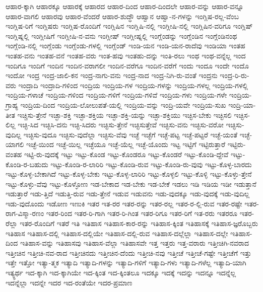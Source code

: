 {ಆಹಾರ-ಕ್ಕಾಗಿ
ಆಹಾರಕ್ಕೂ
ಆಹಾರಕ್ಕೆ
ಆಹಾರದ
ಆಹಾರ-ದಿಂದ
ಆಹಾರ-ದಿಂದಲೇ
ಆಹಾರ-ವನ್ನು
ಆಹಾರ-ವನ್ನೂ
ಆಹಾರ-ವಾಗಲಿ
ಆಹಾರವು
ಆಹಾರ-ವೆಂದರೆ
ಆಹಾರ-ಶುದ್ಧೌ
ಆಹ್ವಾನ
ಆಹ್ವಾ-ನ-ಗಳನ್ನು
ಇಂಗ್ಲಿಷ-ರಲ್ಲ-ವೆಂಬ
ಇಂಗ್ಲಿಷ-ರಿಗೆ
ಇಂಗ್ಲಿಷರು
ಇಂಗ್ಲಿಷ-ರೊಂದಿಗೆ
ಇಂಗ್ಲಿಷಿನ
ಇಂಗ್ಲಿಷಿ-ನಲ್ಲಿ
ಇಂಗ್ಲೀಷಿ-ನಲ್ಲಿ
ಇಂಗ್ಲಿಷಿನ-ವರಿಗೂ
ಇಂಗ್ಲಿಷ್
ಇಂಗ್ಲಿಷ್ನಲ್ಲಿ
ಇಂಗ್ಲೀಷಿಗೆ
ಇಂಗ್ಲೀಷಿ-ನ-ವನು
ಇಂಗ್ಲೀಷ್
ಇಂಗ್ಲೀಷ್ನಲ್ಲಿ
ಇಂಗ್ಲೆಂಡನ್ನು
ಇಂಗ್ಲೆಂಡಿನ
ಇಂಗ್ಲೆಂಡಿನಂಥ
ಇಂಗ್ಲೆಂಡಿ-ನಲ್ಲಿ
ಇಂಗ್ಲೆಂಡು
ಇಂಗ್ಲೆಂಡು-ಗಳಲ್ಲಿ
ಇಂಗ್ಲೆಂಡ್
ಇಂಡಿ-ಯನ
ಇಂಡಿ-ಯನ-ರಾದೆವು
ಇಂಡಿಯಾ
ಇಂತಹ
ಇಂತಹ-ವನು
ಇಂತಹ-ವನೆ
ಇಂತಹ-ವರು
ಇಂತ-ಹವು
ಇಂತಹು-ದನ್ನು
ಇಂತಿ-ರಲು
ಇಂಥ
ಇಂಥ-ವನ್ನೆಲ್ಲ
ಇಂದ
ಇಂದಿಗೂ
ಇಂದಿಗೆ
ಇಂದಿನ
ಇಂದಿನ-ವರಾಗಲೀ
ಇಂದಿನ-ವರೆಗೂ
ಇಂದಿನ-ವರೆಗೆ
ಇಂದು
ಇಂದೂ
ಇಂದೇ
ಇಂದೊ
ಇಂದೋ
ಇಂದ್ರ
ಇಂದ್ರ-ಜಾಲಿ-ಕನ
ಇಂದ್ರ-ನಾಗು-ವನು
ಇಂದ್ರ-ನಾದ
ಇಂದ್ರ-ನಿಗಿ-ರು-ವಂತೆ
ಇಂದ್ರನು
ಇಂದ್ರ-ರಿ-ರು-ವರು
ಇಂದ್ರಾದಿ
ಇಂದ್ರಾದಿ-ಗಳಿಂದ
ಇಂದ್ರಿಯ
ಇಂದ್ರಿಯ-ಗಳ
ಇಂದ್ರಿಯ-ಗಳನ್ನು
ಇಂದ್ರಿಯ-ಗಳಲ್ಲ
ಇಂದ್ರಿಯ-ಗಳಲ್ಲಿ
ಇಂದ್ರಿಯ-ಗಳಾಚೆ
ಇಂದ್ರಿಯ-ಗಳಿಂದ
ಇಂದ್ರಿಯ-ಗಳಿಗೆ
ಇಂದ್ರಿಯ-ಗಳಿವೆ
ಇಂದ್ರಿಯ-ಗಳು
ಇಂದ್ರಿಯ-ಗಳೇ
ಇಂದ್ರಿಯ-ಗ್ರಾಹ್ಯ
ಇಂದ್ರಿಯ-ದಿಂದ
ಇಂದ್ರಿಯ-ಲೋಲುಪತೆ-ಯಲ್ಲಿ
ಇಂದ್ರಿಯ-ವನ್ನು
ಇಂದ್ರಿ-ಯವೇ
ಇಂದ್ರಿಯ-ಸುಖ
ಇಂದ್ರಿ-ಯಾ-ತೀತ
ಇಚ್ಚಿಸು-ತ್ತೇನೆ
ಇಚ್ಛಾ-ಶಕ್ತಿ
ಇಚ್ಛಾ-ಶಕ್ತಿಯ
ಇಚ್ಛಾ-ಶಕ್ತಿ-ಯನ್ನು
ಇಚ್ಛಾ-ಶಕ್ತಿಯು
ಇಚ್ಛಿಸ-ಬೇಕು
ಇಚ್ಛಿಸಲಿ
ಇಚ್ಛಿಸ-ಲಿಲ್ಲ
ಇಚ್ಛಿ-ಸಿದ
ಇಚ್ಛಿಸಿ-ದನು
ಇಚ್ಛಿ-ಸಿದರು
ಇಚ್ಛಿಸು-ತ್ತೇನೆ
ಇಚ್ಛಿಸುತ್ತೇವೆ
ಇಚ್ಛಿಸು-ವನು
ಇಚ್ಛಿಸು-ವರೋ
ಇಚ್ಛಿಸು-ವುದಿಲ್ಲ
ಇಚ್ಛಿಸು-ವುದೂ
ಇಚ್ಛಿಸು-ವುದೆಲ್ಲಾ
ಇಚ್ಛಿಸು-ವೆವು
ಇಚ್ಛೆ
ಇಚ್ಛೆಗೆ
ಇಚ್ಛೆ-ಪಟ್ಟ
ಇಚ್ಛೆ-ಪಟ್ಟರೆ
ಇಚ್ಛೆ-ಯಂತೆ
ಇಚ್ಛೆ-ಯಾಗಲಿ
ಇಚ್ಛೆ-ಯಿಂದ
ಇಚ್ಛೆ-ಯಿಲ್ಲ
ಇಚ್ಛೆಯೂ
ಇಚ್ಛೆ-ಯೆಲ್ಲ
ಇಚ್ಛೆ-ಯೊಂದು
ಇಟ್ಟ
ಇಟ್ಟಿಗೆ
ಇಟ್ಟಿರುತ್ತಾರೆ
ಇಟ್ಟಿರು-ವಂತಹ
ಇಟ್ಟಿ-ರು-ವುದಕ್ಕೆ
ಇಟ್ಟು
ಇಟ್ಟು-ಕೊಂಡ
ಇಟ್ಟು-ಕೊಂಡರೂ
ಇಟ್ಟು-ಕೊಂಡರೆ
ಇಟ್ಟು-ಕೊಂಡಿ-ದ್ದೇವೆ
ಇಟ್ಟು-ಕೊಂಡಿ-ರ-ಬಹುದು
ಇಟ್ಟು-ಕೊಂಡಿ-ರ-ಲಾರಿರಿ
ಇಟ್ಟು-ಕೊಂಡಿ-ರುವ
ಇಟ್ಟು-ಕೊಂಡಿ-ರು-ವುವು
ಇಟ್ಟು-ಕೊಳ್ಳ-ಬಾರದು
ಇಟ್ಟು-ಕೊಳ್ಳ-ಬೇಕಾಗಿದೆ
ಇಟ್ಟು-ಕೊಳ್ಳ-ಬೇಕು
ಇಟ್ಟು-ಕೊಳ್ಳ-ಲಾರಿರಿ
ಇಟ್ಟು-ಕೊಳ್ಳಲಿ
ಇಟ್ಟು-ಕೊಳ್ಳಿ
ಇಟ್ಟು-ಕೊಳ್ಳು-ತ್ತೇನೆ
ಇಟ್ಟು-ಕೊಳ್ಳು-ವೆವು
ಇಟ್ಟು-ಕೊಳ್ಳೋಣ
ಇಡ-ಬೇಕಾದ
ಇಡ-ಬೇಕು
ಇಡ-ಬೇಕೆ
ಇಡಲು
ಇಡಿ
ಇಡಿಯ
ಇಡೀ
ಇಡುತ್ತಾನೆ
ಇಡುತ್ತಾರೆ
ಇಡು-ತ್ತಿದೆ
ಇಡುತ್ತಿ-ರುವ
ಇಡು-ತ್ತೇನೆ
ಇಡುವ
ಇಡುವನು
ಇಡು-ವುದಕ್ಕೂ
ಇಡು-ವುದಕ್ಕೆ
ಇಡು-ವುದಿಲ್ಲ
ಇಡು-ವುದೊಂದು
ಇಡೋಣ
ಇಣುಕಿ
ಇತರ
ಇತ-ರರ
ಇತರ-ರನ್ನು
ಇತರ-ರಲ್ಲ
ಇತರ-ರ-ಲ್ಲಿ-ರುವ
ಇತರ-ರಷ್ಟೇ
ಇತರ-ರಾಗ-ವಿಸ್ಮಾ-ರಣಂ
ಇತರ-ರಿಂದ
ಇತರ-ರಿ-ಗಾಗಿ
ಇತರ-ರಿ-ಗಿಂತ
ಇತರ-ರಿಗೂ
ಇತರ-ರಿಗೆ
ಇತ-ರರು
ಇತರರೂ
ಇತರ-ರೆಲ್ಲಾ
ಇತರ-ರೊಂದಿಗೆ
ಇತರೆ
ಇತಿ
ಇತಿಹಾಸ
ಇತಿಹಾಸ-ಕಾರ-ರನ್ನು
ಇತಿಹಾಸ-ಕ್ಕಿಂತ
ಇತಿಹಾಸಕ್ಕೆ
ಇತಿಹಾಸ-ಜ್ಞರೊಬ್ಬರು
ಇತಿಹಾಸ
ಇತಿಹಾಸ-ದಲ್ಲಿ
ಇತಿಹಾಸ-ದಲ್ಲಿಯೇ
ಇತಿಹಾಸ-ದಲ್ಲಿ-ರುವ
ಇತಿಹಾಸ-ದಲ್ಲೆಲ್ಲಾ
ಇತಿಹಾಸ-ದಲ್ಲೇ
ಇತಿಹಾಸ-ದಿಂದ
ಇತಿಹಾಸ-ವನ್ನು
ಇತಿಹಾಸವು
ಇತಿಹಾಸ-ವೆಲ್ಲಾ
ಇತಿಹಾಸವೇ
ಇತ್ತ
ಇತ್ತರು
ಇತ್ತ-ವರಾರು
ಇತ್ತೀಚಿಗಿ-ನವರಾದ
ಇತ್ತೀಚಿನ
ಇತ್ತೀಚಿ-ನವ-ರಾದ
ಇತ್ತೀಚಿನದು
ಇತ್ತೀಚಿನ-ದೆಂದು
ಇತ್ತೀಚಿ-ನವು
ಇತ್ತೀಚೆ
ಇತ್ತೀಚೆ-ಗಷ್ಟೇ
ಇತ್ತೀಚೆಗೆ
ಇತ್ತು
ಇತ್ತೇ
ಇತ್ತೋ
ಇತ್ಯಾ-ತ್ಮಕ
ಇತ್ಯಾದಿ
ಇತ್ಯಾದಿ-ಗಳನ್ನು
ಇತ್ಯಾದಿ-ಗಳಿಗೆ
ಇತ್ಯಾದಿ-ಗಳು
ಇತ್ಯಾದಿ-ಗಳೆಲ್ಲ
ಇತ್ಯಾದಿ-ಯಾಗಿ
ಇತ್ಯ್ಧರ್ಥ
ಇದ-ಕ್ಕಾಗಿ
ಇದ-ಕ್ಕಾಗಿಯೇ
ಇದ-ಕ್ಕಿಂತ
ಇದ-ಕ್ಕಿಂತಲೂ
ಇದಕ್ಕೂ
ಇದಕ್ಕೆ
ಇದನ್ನು
ಇದನ್ನೂ
ಇದನ್ನೆಲ್ಲ
ಇದನ್ನೆಲ್ಲಾ
ಇದನ್ನೇ
ಇದರ
ಇದ-ರಂತೆಯೇ
ಇದರ-ಪ್ರಮಾಣ
}
